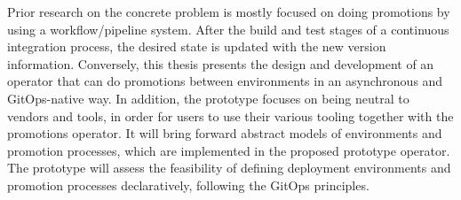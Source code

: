Prior research on the concrete problem is mostly focused on
doing promotions by using a workflow/pipeline system.
After the build and test stages of a continuous integration process,
the desired state is updated with the new version information.
%
Conversely, this thesis presents the design and development
of an operator that can do promotions between environments
in an asynchronous and GitOps-native way.
In addition, the prototype focuses on being neutral to vendors
and tools, in order for users to use their various tooling
together with the promotions operator.
It will bring forward
abstract models of environments and promotion processes,
which are implemented in the proposed prototype operator.
The prototype will assess the feasibility of
defining deployment environments and promotion processes declaratively,
following the GitOps principles.






























%
%
%
%
%
%
%
%






